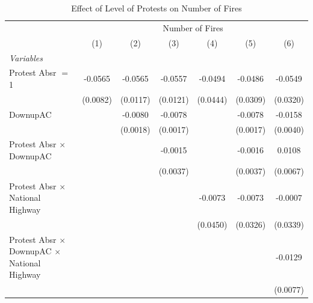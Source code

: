 
\begin{table}[htbp]
   \caption{\label{tab:protest_treat_main} Effect of Level of Protests on Number of Fires}
   \centering
   \begin{tabular}{lcccccc}
      \tabularnewline \midrule \midrule
       & \multicolumn{6}{c}{Number of Fires}\\
                                                                 & (1)           & (2)           & (3)           & (4)           & (5)           & (6)\\  
      \midrule
      \emph{Variables}\\
      Protest Absr $=$ 1                                         & -0.0565       & -0.0565       & -0.0557       & -0.0494       & -0.0486       & -0.0549\\   
                                                                 & (0.0082)      & (0.0117)      & (0.0121)      & (0.0444)      & (0.0309)      & (0.0320)\\   
      DownupAC                                                   &               & -0.0080       & -0.0078       &               & -0.0078       & -0.0158\\   
                                                                 &               & (0.0018)      & (0.0017)      &               & (0.0017)      & (0.0040)\\   
      Protest Absr $\times$ DownupAC                             &               &               & -0.0015       &               & -0.0016       & 0.0108\\   
                                                                 &               &               & (0.0037)      &               & (0.0037)      & (0.0067)\\   
      Protest Absr $\times$ National Highway                     &               &               &               & -0.0073       & -0.0073       & -0.0007\\   
                                                                 &               &               &               & (0.0450)      & (0.0326)      & (0.0339)\\   
      Protest Absr $\times$ DownupAC $\times$ National Highway   &               &               &               &               &               & -0.0129\\   
                                                                 &               &               &               &               &               & (0.0077)\\   

\end{tabular}
\end{table}
